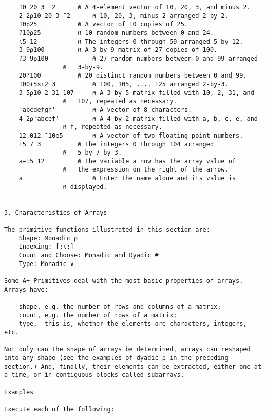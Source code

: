 \documentclass{article}
\begin{document}
\begin{verbatim}
	10 20 3 ¯2		⍝ A 4-element vector of 10, 20, 3, and minus 2.
	2 2⍴10 20 3 ¯2		⍝ 10, 20, 3, minus 2 arranged 2-by-2. 
 	10⍴25			⍝ A vector of 10 copies of 25.
	?10⍴25			⍝ 10 random numbers between 0 and 24.
	⍳5 12			⍝ The integers 0 through 59 arranged 5-by-12.
 	3 9⍴100 		⍝ A 3-by-9 matrix of 27 copies of 100.  
	?3 9⍴100        	⍝ 27 random numbers between 0 and 99 arranged 
				⍝   3-by-9.
 	20?100			⍝ 20 distinct random numbers between 0 and 99. 
 	100+5×⍳2 3      	⍝ 100, 105, ..., 125 arranged 2-by-3.   
 	3 5⍴10 2 31 107 	⍝ A 3-by-5 matrix filled with 10, 2, 31, and 
				⍝   107, repeated as necessary. 
	'abcdefgh'    		⍝ A vector of 8 characters. 
	4 2⍴'abcef'     	⍝ A 4-by-2 matrix filled with a, b, c, e, and 
				⍝ f, repeated as necessary.
 	12.012 ¯10e5   		⍝ A vector of two floating point numbers. 
	⍳5 7 3			⍝ The integers 0 through 104 arranged
				⍝   5-by-7-by-3. 
	a←⍳5 12			⍝ The variable a now has the array value of 
				⍝   the expression on the right of the arrow. 
	a               	⍝ Enter the name alone and its value is 
				⍝ displayed.   


3. Characteristics of Arrays                                          

The primitive functions illustrated in this section are:              
	Shape: Monadic ⍴                                                     
	Indexing: [;⍳;]                                                      
	Count and Choose: Monadic and Dyadic #                               
	Type: Monadic ∨                                                      

Some A+ Primitives deal with the most basic properties of arrays.     
Arrays have:                                                          

    shape, e.g. the number of rows and columns of a matrix;           
    count, e.g. the number of rows of a matrix;                       
    type,  this is, whether the elements are characters, integers, etc.

Not only can the shape of arrays be determined, arrays can reshaped   
into any shape (see the examples of dyadic ⍴ in the preceding         
section.) And, finally, their elements can be extracted, either one at
a time, or in contiguous blocks called subarrays.                     

Examples                                                              

Execute each of the following:                                        


\end{verbatim}
\end{document}

